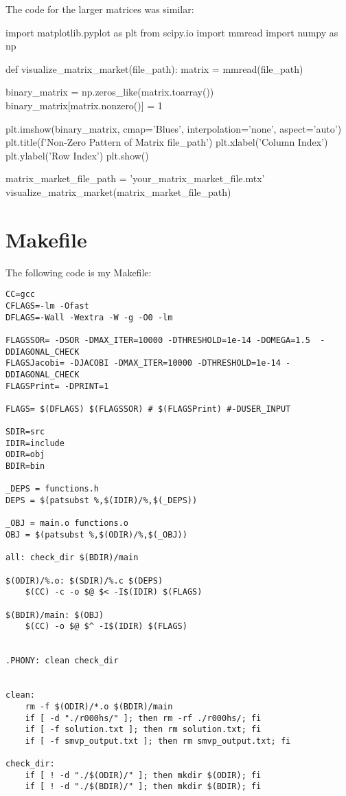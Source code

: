 \documentclass[12pt]{article}
\begin{document}
    The code for the larger matrices was similar:

    \begin{python}
import matplotlib.pyplot as plt
from scipy.io import mmread
import numpy as np

def visualize_matrix_market(file_path):
    matrix = mmread(file_path)

    binary_matrix = np.zeros_like(matrix.toarray())
    binary_matrix[matrix.nonzero()] = 1

    plt.imshow(binary_matrix, cmap='Blues', interpolation='none', aspect='auto')
    plt.title(f'Non-Zero Pattern of Matrix {file_path}')
    plt.xlabel('Column Index')
    plt.ylabel('Row Index')
    plt.show()

matrix_market_file_path = 'your_matrix_market_file.mtx'
visualize_matrix_market(matrix_market_file_path)

    \end{python}

    \newpage

    \section{Makefile}

    The following code is my Makefile:

    \begin{verbatim}
CC=gcc
CFLAGS=-lm -Ofast
DFLAGS=-Wall -Wextra -W -g -O0 -lm

FLAGSSOR= -DSOR -DMAX_ITER=10000 -DTHRESHOLD=1e-14 -DOMEGA=1.5  -DDIAGONAL_CHECK
FLAGSJacobi= -DJACOBI -DMAX_ITER=10000 -DTHRESHOLD=1e-14 -DDIAGONAL_CHECK 
FLAGSPrint= -DPRINT=1

FLAGS= $(DFLAGS) $(FLAGSSOR) # $(FLAGSPrint) #-DUSER_INPUT

SDIR=src
IDIR=include
ODIR=obj
BDIR=bin

_DEPS = functions.h
DEPS = $(patsubst %,$(IDIR)/%,$(_DEPS))

_OBJ = main.o functions.o
OBJ = $(patsubst %,$(ODIR)/%,$(_OBJ))

all: check_dir $(BDIR)/main

$(ODIR)/%.o: $(SDIR)/%.c $(DEPS)
	$(CC) -c -o $@ $< -I$(IDIR) $(FLAGS)

$(BDIR)/main: $(OBJ)
	$(CC) -o $@ $^ -I$(IDIR) $(FLAGS)


.PHONY: clean check_dir


clean:
	rm -f $(ODIR)/*.o $(BDIR)/main
	if [ -d "./r000hs/" ]; then rm -rf ./r000hs/; fi
	if [ -f solution.txt ]; then rm solution.txt; fi
	if [ -f smvp_output.txt ]; then rm smvp_output.txt; fi

check_dir:
	if [ ! -d "./$(ODIR)/" ]; then mkdir $(ODIR); fi
	if [ ! -d "./$(BDIR)/" ]; then mkdir $(BDIR); fi
    \end{verbatim}
\end{document}
